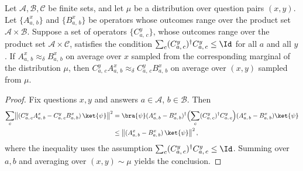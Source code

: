 \begin{lemma}\label{fact:add-a-proj}
	\leanok
	Let $\mathcal A, \mathcal B, \mathcal C$ be finite sets, and let $\mu$ be a distribution over question pairs $(x,y)$. Let $\{A^x_{a,\,b}\}$ and $\{B^x_{a,\,b}\}$ be operators whose outcomes range over the product set $\mathcal A \times \mathcal B$. Suppose a set of operators $\{C^y_{a,\,c}\}$, whose outcomes range over the product set $\mathcal A \times \mathcal C$, satisfies the condition $\sum_c (C^y_{a,\,c})^\dagger C^y_{a,\,c} \le \Id$ for all $a$ and all $y$. If $A^x_{a,\,b} \approx_\delta B^x_{a,\,b}$ on average over $x$ sampled from the corresponding marginal of the distribution $\mu$, then $C^y_{a,\,c} A^x_{a,\,b} \approx_\delta C^y_{a,\,c} B^x_{a,\,b}$ on average over $(x,y)$ sampled from $\mu$.
\end{lemma}
\begin{proof}
	\leanok
	Fix questions $x, y$ and answers $a \in \mathcal A$, $b \in \mathcal B$. Then
	\begin{align*}
		\sum_c \bigl\lVert (C^y_{a,\,c} A^x_{a,\,b} - C^y_{a,\,c} B^x_{a,\,b})\, \ket{\psi} \bigr\rVert^2
		&= \bra{\psi} (A^x_{a,\,b} - B^x_{a,\,b})^\dagger \Bigl( \sum_c (C^y_{a,\,c})^\dagger C^y_{a,\,c} \Bigr) (A^x_{a,\,b} - B^x_{a,\,b}) \ket{\psi}\\
		&\le \bigl\lVert (A^x_{a,\,b} - B^x_{a,\,b})\, \ket{\psi} \bigr\rVert^2\,,
	\end{align*}
	where the inequality uses the assumption $\sum_c (C^y_{a,\,c})^\dagger C^y_{a,\,c} \le \Id$. Summing over $a, b$ and averaging over $(x,y) \sim \mu$ yields the conclusion.
\end{proof}

